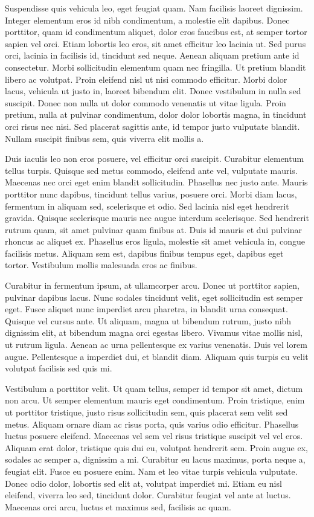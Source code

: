Suspendisse quis vehicula leo, eget feugiat quam. Nam facilisis laoreet dignissim. Integer elementum eros id nibh condimentum, a molestie elit dapibus. Donec porttitor, quam id condimentum aliquet, dolor eros faucibus est, at semper tortor sapien vel orci. Etiam lobortis leo eros, sit amet efficitur leo lacinia ut. Sed purus orci, lacinia in facilisis id, tincidunt sed neque. Aenean aliquam pretium ante id consectetur. Morbi sollicitudin elementum quam nec fringilla. Ut pretium blandit libero ac volutpat. Proin eleifend nisl ut nisi commodo efficitur. Morbi dolor lacus, vehicula ut justo in, laoreet bibendum elit. Donec vestibulum in nulla sed suscipit. Donec non nulla ut dolor commodo venenatis ut vitae ligula. Proin pretium, nulla at pulvinar condimentum, dolor dolor lobortis magna, in tincidunt orci risus nec nisi. Sed placerat sagittis ante, id tempor justo vulputate blandit. Nullam suscipit finibus sem, quis viverra elit mollis a.

Duis iaculis leo non eros posuere, vel efficitur orci suscipit. Curabitur elementum tellus turpis. Quisque sed metus commodo, eleifend ante vel, vulputate mauris. Maecenas nec orci eget enim blandit sollicitudin. Phasellus nec justo ante. Mauris porttitor nunc dapibus, tincidunt tellus varius, posuere orci. Morbi diam lacus, fermentum in aliquam sed, scelerisque et odio. Sed lacinia nisl eget hendrerit gravida. Quisque scelerisque mauris nec augue interdum scelerisque. Sed hendrerit rutrum quam, sit amet pulvinar quam finibus at. Duis id mauris et dui pulvinar rhoncus ac aliquet ex. Phasellus eros ligula, molestie sit amet vehicula in, congue facilisis metus. Aliquam sem est, dapibus finibus tempus eget, dapibus eget tortor. Vestibulum mollis malesuada eros ac finibus.

Curabitur in fermentum ipsum, at ullamcorper arcu. Donec ut porttitor sapien, pulvinar dapibus lacus. Nunc sodales tincidunt velit, eget sollicitudin est semper eget. Fusce aliquet nunc imperdiet arcu pharetra, in blandit urna consequat. Quisque vel cursus ante. Ut aliquam, magna ut bibendum rutrum, justo nibh dignissim elit, at bibendum magna orci egestas libero. Vivamus vitae mollis nisl, ut rutrum ligula. Aenean ac urna pellentesque ex varius venenatis. Duis vel lorem augue. Pellentesque a imperdiet dui, et blandit diam. Aliquam quis turpis eu velit volutpat facilisis sed quis mi.

Vestibulum a porttitor velit. Ut quam tellus, semper id tempor sit amet, dictum non arcu. Ut semper elementum mauris eget condimentum. Proin tristique, enim ut porttitor tristique, justo risus sollicitudin sem, quis placerat sem velit sed metus. Aliquam ornare diam ac risus porta, quis varius odio efficitur. Phasellus luctus posuere eleifend. Maecenas vel sem vel risus tristique suscipit vel vel eros. Aliquam erat dolor, tristique quis dui eu, volutpat hendrerit sem. Proin augue ex, sodales ac semper a, dignissim a mi. Curabitur eu lacus maximus, porta neque a, feugiat elit. Fusce eu posuere enim. Nam et leo vitae turpis vehicula vulputate. Donec odio dolor, lobortis sed elit at, volutpat imperdiet mi. Etiam eu nisl eleifend, viverra leo sed, tincidunt dolor. Curabitur feugiat vel ante at luctus. Maecenas orci arcu, luctus et maximus sed, facilisis ac quam.

